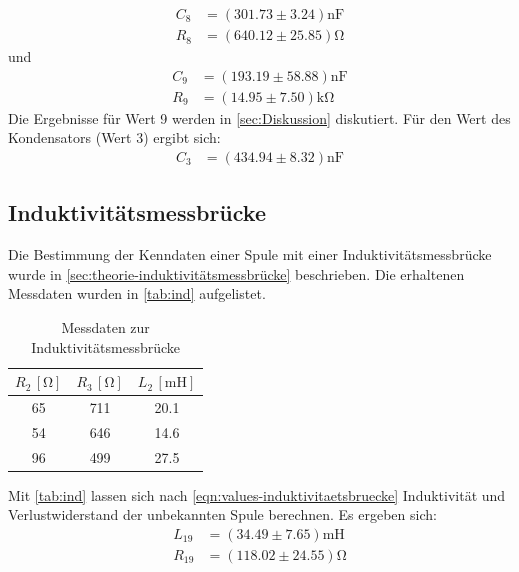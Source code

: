 \begin{align}
  C_8&=(301.73 \pm 3.24)\si{\nano} \si{\farad}\\
  R_8&=(640.12 \pm 25.85) \si{\ohm}
\end{align}
und
\begin{align}
  C_9&=(193.19 \pm 58.88)\si{\nano} \si{\farad}\\
  R_9&=(14.95 \pm 7.50)\si{\kilo} \si{\ohm}
\end{align}
Die Ergebnisse für Wert 9 werden in \autoref{sec:Diskussion} diskutiert. 
Für den Wert des Kondensators (Wert 3) ergibt sich:
\begin{align}
  C_3&=(434.94 \pm 8.32)\si{\nano} \si{\farad}
\end{align}

\subsection{Induktivitätsmessbrücke}
 Die Bestimmung der Kenndaten einer Spule mit einer Induktivitätsmessbrücke wurde in \autoref{sec:theorie-induktivitätsmessbrücke} beschrieben. Die erhaltenen Messdaten wurden in \autoref{tab:ind} aufgelistet.
\begin{table}
  \centering
  \caption{Messdaten zur Induktivitätsmessbrücke}
  \label{tab:ind}
  \begin{tabular}{c c c}
  \toprule
  $R_2 \, [\si{\ohm}]$ &$R_3 \, [\si{\ohm}]$ &$L_2 \, [\si{\milli} \si{\henry}]$\\
  \midrule
   65 & 711 & 20.1\\
   54 & 646 & 14.6 \\
   96 & 499 & 27.5 \\
  \bottomrule
  \end{tabular}
\end{table}
Mit  \autoref{tab:ind} lassen sich nach \autoref{eqn:values-induktivitaetsbruecke} Induktivität und Verlustwiderstand der unbekannten Spule berechnen. Es ergeben sich:
\begin{align}
  L_{19}&=(34.49 \pm 7.65)\si{\milli} \si{\henry}\\
  R_{19}&=(118.02 \pm 24.55)\si{\ohm}
\end{align}

